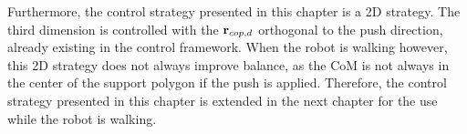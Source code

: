 Furthermore, the control strategy presented in this chapter is a \ac{2D} strategy. The third dimension is controlled with the $\mathbf{r}_{cop,d}$ orthogonal to the push direction, already existing in the control framework. When the robot is walking however, this \ac{2D} strategy does not always improve balance, as the \ac{CoM} is not always in the center of the support polygon if the push is applied. Therefore, the control strategy presented in this chapter is extended in the next chapter for the use while the robot is walking.



